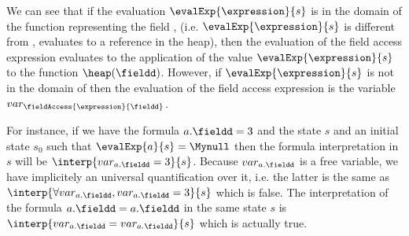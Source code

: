 We can see that if the evaluation $\evalExp{ \expression}{ s } $ is in the domain of the function representing the field \fieldd{},
(i.e.  $\evalExp{ \expression}{ s } $ is different from \Mynull{}, evaluates to a reference in the heap),  
then the evaluation of the field access expression evaluates to the application of the value  $\evalExp{ \expression}{ s } $ to
the function  $\heap(\fieldd)$. However, if  $\evalExp{ \expression}{ s } $ is not in the domain of \fieldd{} then the 
evaluation of the field access expression is  the  variable $var_{\scriptsize{ \fieldAccess{\expression}{\fieldd}}  }$.


For instance, if we have the formula $a.\fieldd = 3$ and the  state $s$ and an initial state $s_0$
 such that $\evalExp{a}{s} = \Mynull$ then the formula interpretation in $ s$  will be 
$\interp{var_{\scriptsize{ a.\fieldd}} = 3 } {s} $. Because $var_{\scriptsize{ a.\fieldd}} $ is a free variable, we have implicitely an universal
 quantification over it, i.e. the latter is the same as  $   \interp{ \forall var_{a.\fieldd}, var_{\scriptsize{ a.\fieldd}} = 3  } {s}$ which is false.
The interpretation of the formula  $a.\fieldd = a.\fieldd $  in the same state $s$  is 
$\interp{var_{\scriptsize{ a.\fieldd}} =var_{\scriptsize{ a.\fieldd}}   } {s} $ which is actually true.






